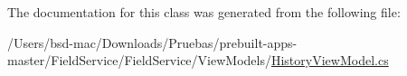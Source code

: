 The documentation for this class was generated from the following file\+:\begin{DoxyCompactItemize}
\item 
/\+Users/bsd-\/mac/\+Downloads/\+Pruebas/prebuilt-\/apps-\/master/\+Field\+Service/\+Field\+Service/\+View\+Models/\hyperlink{_view_models_2_history_view_model_8cs}{History\+View\+Model.\+cs}\end{DoxyCompactItemize}
